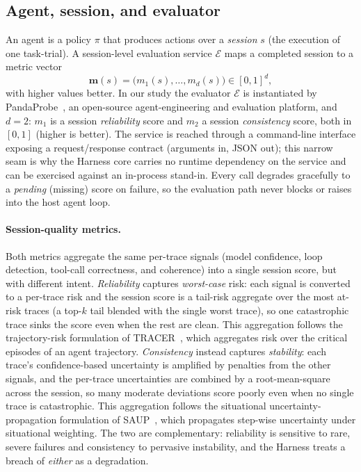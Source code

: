\documentclass[letterpaper]{article} %
\newcommand{\evalfn}{\mathcal{E}}                 %
\newcommand{\mvec}{\mathbf{m}}                    %
\begin{document}
\subsection{Agent, session, and evaluator}
\label{sec:setup-formal}

An agent is a policy $\pi$ that produces actions over a \emph{session} $s$ (the execution of
one task-trial). A session-level evaluation service $\evalfn$ maps a completed session to a
metric vector
\begin{equation}
  \mvec(s) = \bigl(m_1(s),\dots,m_d(s)\bigr) \in [0,1]^d,
  \label{eq:metricvec}
\end{equation}
with higher values better. In our study the evaluator $\evalfn$ is instantiated by
PandaProbe~\citep{Tayebati_pandaprobe_2026}, an open-source agent-engineering and evaluation
platform, and $d{=}2$: $m_1$ is a session \emph{reliability} score and $m_2$ a session
\emph{consistency} score, both in $[0,1]$ (higher is better).
The service is reached through a command-line interface exposing a request/response contract
(arguments in, JSON out); this narrow seam is why the Harness core carries no runtime dependency
on the service and can be exercised against an in-process stand-in. Every call degrades gracefully
to a \emph{pending} (missing) score on failure, so the evaluation path never blocks or raises into
the host agent loop.

\paragraph{Session-quality metrics.} Both metrics aggregate the same per-trace signals (model
confidence, loop detection, tool-call correctness, and coherence) into a single session score,
but with different intent. \emph{Reliability} captures \emph{worst-case} risk: each signal is
converted to a per-trace risk and the session score is a tail-risk aggregate over the most at-risk
traces (a top-$k$ tail blended with the single worst trace), so one catastrophic trace sinks the
score even when the rest are clean. This aggregation follows the trajectory-risk formulation of
TRACER~\citep{tayebati2026tracer}, which aggregates risk over the critical episodes of an agent
trajectory. \emph{Consistency} instead captures \emph{stability}: each trace's confidence-based
uncertainty is amplified by penalties from the other signals, and the per-trace uncertainties are
combined by a root-mean-square across the session, so many moderate deviations score poorly even
when no single trace is catastrophic. This aggregation follows the situational
uncertainty-propagation formulation of SAUP~\citep{zhao2024saup}, which propagates step-wise
uncertainty under situational weighting. The two are complementary: reliability is sensitive to
rare, severe failures and consistency to pervasive instability, and the Harness treats a breach of
\emph{either} as a degradation.
\end{document}
